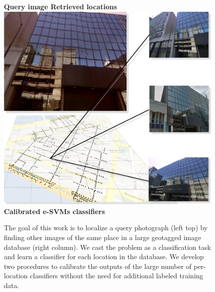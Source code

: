 \begin{figure}[th]
  \textbf{
    \hspace{0.15\linewidth}Query image\hspace{0.3\linewidth} Retrieved locations \hspace{0.05\linewidth}
  }
  \includegraphics[width=1.0\linewidth]{imgs/titleVertical.pdf}
  \textbf{\textcolor{white}{\quad\quad}Calibrated e-SVMs classifiers}
  \caption{
          The goal of this work is to localize a query photograph (left top) by finding other images of the same place in a large geotagged image database (right column). We cast the problem as a classification task and learn a classifier for each location in the database. 
          We develop two procedures to calibrate the outputs of the large number of per-location classifiers without the need for additional labeled training data.
        }
\end{figure}


